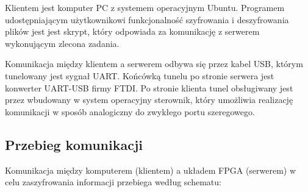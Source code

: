 Klientem jest komputer PC z systemem operacyjnym Ubuntu. Programem udostępniającym użytkownikowi funkcjonalność szyfrowania i deszyfrowania plików jest jest skrypt, który odpowiada za komunikację z serwerem wykonującym zlecona zadania.

Komunikacja między klientem a serwerem odbywa się przez kabel USB, którym tunelowany jest sygnał UART. Końcówką tunelu po stronie serwera jest konwerter UART-USB firmy FTDI. Po stronie klienta tunel obsługiwany jest przez wbudowany w system operacyjny sterownik, który umożliwia realizację komunikacji w sposób analogiczny do zwykłego portu szeregowego.


\subsection{Przebieg komunikacji}
\label{sec:przebieg-komunikacji}
Komunikacja między komputerem (klientem) a układem FPGA (serwerem) w celu zaszyfrowania informacji przebiega według schematu:
